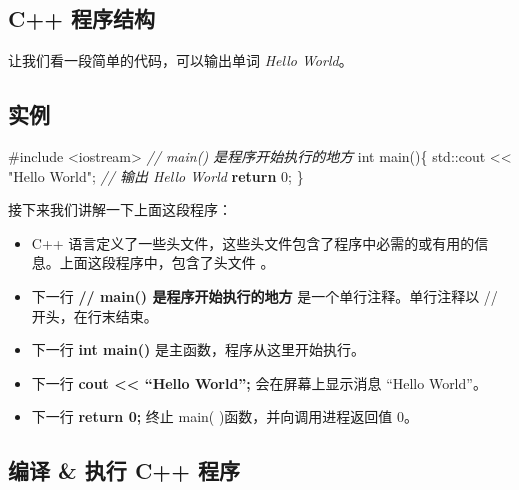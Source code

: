 \documentclass[
]{article}
\newenvironment{Shaded}{}{}
\newcommand{\BuiltInTok}[1]{#1}
\newcommand{\CommentTok}[1]{\textcolor[rgb]{0.38,0.63,0.69}{\textit{#1}}}
\newcommand{\ControlFlowTok}[1]{\textcolor[rgb]{0.00,0.44,0.13}{\textbf{#1}}}
\newcommand{\DataTypeTok}[1]{\textcolor[rgb]{0.56,0.13,0.00}{#1}}
\newcommand{\DecValTok}[1]{\textcolor[rgb]{0.25,0.63,0.44}{#1}}
\newcommand{\ImportTok}[1]{#1}
\newcommand{\NormalTok}[1]{#1}
\newcommand{\OperatorTok}[1]{\textcolor[rgb]{0.40,0.40,0.40}{#1}}
\newcommand{\PreprocessorTok}[1]{\textcolor[rgb]{0.74,0.48,0.00}{#1}}
\newcommand{\StringTok}[1]{\textcolor[rgb]{0.25,0.44,0.63}{#1}}
\providecommand{\tightlist}{%
  \setlength{\itemsep}{0pt}\setlength{\parskip}{0pt}}
\begin{document}
\hypertarget{c-ux7a0bux5e8fux7ed3ux6784}{%
\subsection{C++ 程序结构}\label{c-ux7a0bux5e8fux7ed3ux6784}}

让我们看一段简单的代码，可以输出单词 \emph{Hello World}。

\hypertarget{ux5b9eux4f8b}{%
\subsection{实例}\label{ux5b9eux4f8b}}

\begin{Shaded}
\begin{Highlighting}[]
\PreprocessorTok{\#include }\ImportTok{\textless{}iostream\textgreater{}}\PreprocessorTok{ }
\CommentTok{// main() 是程序开始执行的地方 }
\DataTypeTok{int}\NormalTok{ main}\OperatorTok{()\{}   
    \BuiltInTok{std::}\NormalTok{cout}\OperatorTok{ \textless{}\textless{}} \StringTok{"Hello World"}\OperatorTok{;} \CommentTok{// 输出 Hello World   }
   \ControlFlowTok{return} \DecValTok{0}\OperatorTok{;}
\OperatorTok{\}}
\end{Highlighting}
\end{Shaded}

接下来我们讲解一下上面这段程序：

\begin{itemize}
\tightlist
\item
  C++
  语言定义了一些头文件，这些头文件包含了程序中必需的或有用的信息。上面这段程序中，包含了头文件
  \textbf{}。
\item
  下一行 \textbf{// main() 是程序开始执行的地方}
  是一个单行注释。单行注释以 // 开头，在行末结束。
\item
  下一行 \textbf{int main()} 是主函数，程序从这里开始执行。
\item
  下一行 \textbf{cout \textless\textless{} ``Hello World'';}
  会在屏幕上显示消息 ``Hello World''。
\item
  下一行 \textbf{return 0;} 终止 main( )函数，并向调用进程返回值 0。
\end{itemize}

\hypertarget{ux7f16ux8bd1-ux6267ux884c-c-ux7a0bux5e8f}{%
\subsection{编译 \& 执行 C++
程序}\label{ux7f16ux8bd1-ux6267ux884c-c-ux7a0bux5e8f}}
\end{document}
